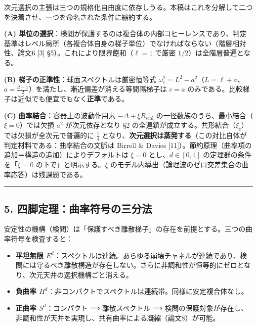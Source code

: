 \documentclass[
]{ltjsarticle}
\providecommand{\tightlist}{%
  \setlength{\itemsep}{0pt}\setlength{\parskip}{0pt}}
\begin{document}
次元選択の主張は三つの規格化自由度に依存しうる。本稿はこれを分解して二つを決着させ、一つを命名された条件に縮約する。

\textbf{(A)
単位の選択}：検閲が保護するのは複合体の内部コヒーレンスであり、判定基準はレベル局所（各複合体自身の梯子単位）でなければならない（階層相対性、論文6
{[}3{]} §5）。これにより限界飽和（\(\ell=1\) で厳密
\(1/2\)）は全階層普遍となる。

\textbf{(B) 梯子の正準性}：球面スペクトルは厳密恒等式
\(\omega_\ell^2=L^2-a^2\)（\(L=\ell+a\)、\(a=\tfrac{d-1}2\)）を満たし、漸近偏差が消える等間隔梯子は
\(c=a\) のみである。比較梯子は近似でも便宜でもなく\textbf{正準}である。

\textbf{(C) 曲率結合}：容器上の波動作用素
\(-\Delta+\xi R_{\mathrm{scal}}\)
の一径数族のうち、最小結合（\(\xi=0\)）では欠損 \(a^2\) が次元依存となり
§2 の全連鎖が成立する。共形結合（\(\xi_c\)）では欠損が全次元で普遍的に
\(\tfrac14\)
となり、\textbf{次元選択は蒸発する}（この対比自体が判定材料である：曲率結合の文脈は
Birrell \& Davies
{[}11{]}）。節約原理（曲率項の追加＝構造の追加）によりデフォルトは
\(\xi=0\) とし、\(d\in[0,4]\) の定理群の条件を「\(\xi=0\)
の下で」と明示する。\(\xi\)
のモデル内導出（論理波のゼロ交差集合の曲率応答）は残課題である。

\begin{center}\rule{0.5\linewidth}{0.5pt}\end{center}

\subsection{5.
四脚定理：曲率符号の三分法}\label{ux56dbux811aux5b9aux7406ux66f2ux7387ux7b26ux53f7ux306eux4e09ux5206ux6cd5}

安定性の機構（検閲）は「保護すべき離散梯子」の存在を前提とする。三つの曲率符号を検査すると：

\begin{itemize}
\tightlist
\item
  \textbf{平坦無限
  \(E^d\)}：スペクトルは連続。あらゆる崩壊チャネルが連続であり、検閲には守るべき離散構造が存在しない。さらに非調和性が恒等的にゼロとなり、次元天井の選択機構ごと消える。
\item
  \textbf{負曲率
  \(H^d\)}：非コンパクトでスペクトルは連続帯。同様に安定複合体なし。
\item
  \textbf{正曲率 \(S^d\)}：コンパクト ⟹ 離散スペクトル ⟹
  検閲の保護対象が存在し、非調和性が天井を実現し、共有曲率による凝縮（論文8）が可能。
\end{itemize}
\end{document}
